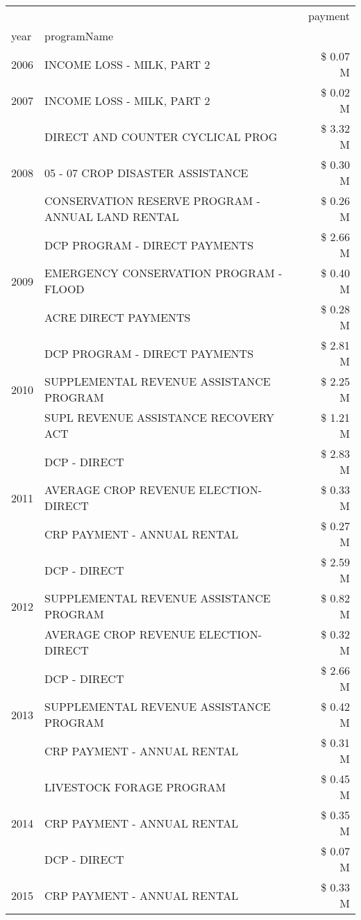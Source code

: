 \begin{tabular}{llr}
\toprule
 &  & payment \\
year & programName &  \\
\midrule
2006 & INCOME LOSS - MILK, PART 2 & \$ 0.07 M \\
\cline{1-3}
2007 & INCOME LOSS - MILK, PART 2 & \$ 0.02 M \\
\cline{1-3}
\multirow[t]{3}{*}{2008} & DIRECT AND COUNTER CYCLICAL PROG & \$ 3.32 M \\
 & 05 - 07 CROP DISASTER ASSISTANCE & \$ 0.30 M \\
 & CONSERVATION RESERVE PROGRAM - ANNUAL LAND RENTAL & \$ 0.26 M \\
\cline{1-3}
\multirow[t]{3}{*}{2009} & DCP PROGRAM - DIRECT PAYMENTS & \$ 2.66 M \\
 & EMERGENCY CONSERVATION PROGRAM - FLOOD & \$ 0.40 M \\
 & ACRE DIRECT PAYMENTS & \$ 0.28 M \\
\cline{1-3}
\multirow[t]{3}{*}{2010} & DCP PROGRAM - DIRECT PAYMENTS & \$ 2.81 M \\
 & SUPPLEMENTAL REVENUE ASSISTANCE PROGRAM & \$ 2.25 M \\
 & SUPL REVENUE ASSISTANCE RECOVERY ACT & \$ 1.21 M \\
\cline{1-3}
\multirow[t]{3}{*}{2011} & DCP - DIRECT & \$ 2.83 M \\
 & AVERAGE CROP REVENUE ELECTION-DIRECT & \$ 0.33 M \\
 & CRP PAYMENT - ANNUAL RENTAL & \$ 0.27 M \\
\cline{1-3}
\multirow[t]{3}{*}{2012} & DCP - DIRECT & \$ 2.59 M \\
 & SUPPLEMENTAL REVENUE ASSISTANCE PROGRAM & \$ 0.82 M \\
 & AVERAGE CROP REVENUE ELECTION-DIRECT & \$ 0.32 M \\
\cline{1-3}
\multirow[t]{3}{*}{2013} & DCP - DIRECT & \$ 2.66 M \\
 & SUPPLEMENTAL REVENUE ASSISTANCE PROGRAM & \$ 0.42 M \\
 & CRP PAYMENT - ANNUAL RENTAL & \$ 0.31 M \\
\cline{1-3}
\multirow[t]{3}{*}{2014} & LIVESTOCK FORAGE PROGRAM & \$ 0.45 M \\
 & CRP PAYMENT - ANNUAL RENTAL & \$ 0.35 M \\
 & DCP - DIRECT & \$ 0.07 M \\
\cline{1-3}
\multirow[t]{3}{*}{2015} & CRP PAYMENT - ANNUAL RENTAL & \$ 0.33 M \\

\end{tabular}
